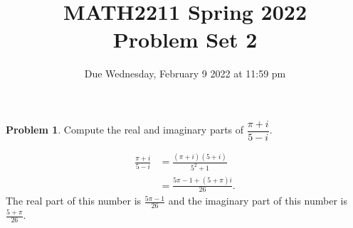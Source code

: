 \documentclass[11pt,oneside]{amsart}
\title{MATH2211 Spring 2022\\
Problem Set 2}
\author{Due Wednesday, February 9 2022 at 11:59 pm}
\theoremstyle{definition}
\newtheorem{problem}{Problem}
\begin{document}
    \maketitle

    \begin{problem}
        Compute the real and imaginary parts of $\dfrac{\pi+i}{5-i}$.
    \end{problem}
    \begin{solution}
        \[\begin{split}
            \frac{\pi+i}{5-i} &= \frac{(\pi+i)(5+i)}{5^2+1}\\
            &= \frac{5\pi-1+(5+\pi)i}{26}.
        \end{split}\]
        The real part of this number is $\frac{5\pi-1}{26}$ and the imaginary part of this number is $\frac{5+\pi}{26}$.
    \end{solution}
\end{document}
